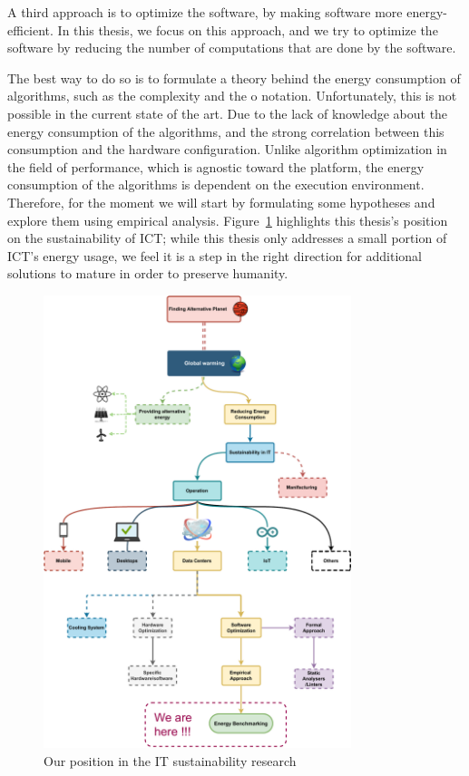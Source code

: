 A third approach is to optimize the software, by making software more energy-efficient. In this thesis, we focus on this approach, and we try to optimize the software by reducing the number of computations that are done by the software.

The best way to do so is to formulate a theory behind the energy consumption of algorithms, such as the complexity and the o notation.
Unfortunately, this is not possible in the current state of the art. Due to the lack of knowledge about the energy consumption of the algorithms, and the strong correlation between this consumption and the hardware configuration.
Unlike algorithm optimization in the field of performance, which is agnostic toward the platform, the energy consumption of the algorithms is dependent on the execution environment.
Therefore, for the moment we will start by formulating some hypotheses and explore them using empirical analysis.
Figure~\ref{fig:thesis_position} highlights this thesis's position on the sustainability of ICT\@; while this thesis only addresses a small portion of ICT's energy usage, we feel it is a step in the right direction for additional solutions to mature in order to preserve humanity.

\begin{figure}[!h]
    \caption{Our position in the IT sustainability research}
    \label{fig:thesis_position}
    \centering
    \includegraphics[width=0.8\textwidth,height=\textheight,keepaspectratio]{chapters/thesis_position.pdf}
\end{figure}
